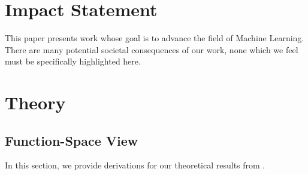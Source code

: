 \documentclass{article}
\begin{document}
\section*{Impact Statement}
This paper presents work whose goal is to advance the field of Machine
Learning. There are many potential societal consequences of our work, none
which we feel must be specifically highlighted here.






\newpage
\appendix
\onecolumn

\section{Theory}
\label{apd:theory}

\subsection{Function-Space View}
In this section, we provide derivations for our theoretical results from .
\end{document}
